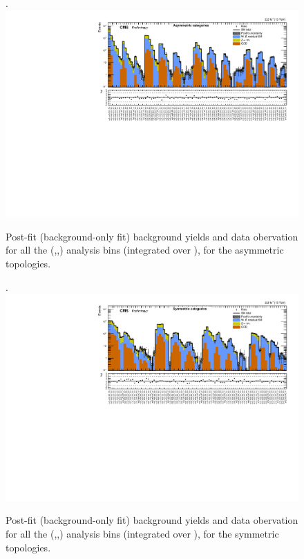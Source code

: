 \clearpage
\begin{landscape}
  \begin{center}
    \begin{figure}[h!]
      \caption{Post-fit (background-only fit) background yields and data obervation for all the (\njet,\nb,\scalht) analysis bins (integrated over \MHT), for the asymmetric topologies. \label{fig:summaryPlot_fit_b_Asymmetric}}.
      \includegraphics[width=0.8\linewidth]{AN-15-004/trunk/figures/postFitResults/summaryPlots/summaryPlot_fit_b_Asymmetric}
    \end{figure}
  \end{center}
\end{landscape}

\clearpage
\begin{landscape}
  \begin{center}
    \begin{figure}[h!]
      \caption{Post-fit (background-only fit) background yields and data obervation for all the (\njet,\nb,\scalht) analysis bins (integrated over \MHT), for the symmetric topologies. \label{fig:summaryPlot_fit_b_Symmetric}}.
      \includegraphics[width=0.8\linewidth]{AN-15-004/trunk/figures/postFitResults/summaryPlots/summaryPlot_fit_b_Symmetric}
    \end{figure}
  \end{center}
\end{landscape}





